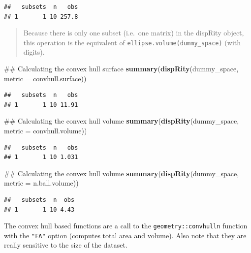 \documentclass[]{book}
\newenvironment{Shaded}{\begin{snugshade}}{\end{snugshade}}
\newcommand{\KeywordTok}[1]{\textcolor[rgb]{0.13,0.29,0.53}{\textbf{#1}}}
\newcommand{\DataTypeTok}[1]{\textcolor[rgb]{0.13,0.29,0.53}{#1}}
\newcommand{\NormalTok}[1]{#1}
\theoremstyle{definition}
\theoremstyle{definition}
\theoremstyle{remark}
\begin{document}
\begin{verbatim}
##   subsets  n   obs
## 1       1 10 257.8
\end{verbatim}

\begin{quote}
Because there is only one subset (i.e.~one matrix) in the dispRity
object, this operation is the equivalent of
\texttt{ellipse.volume(dummy\_space)} (with digits).
\end{quote}

\begin{Shaded}
\begin{Highlighting}[]
\NormalTok{## Calculating the convex hull surface}
\KeywordTok{summary}\NormalTok{(}\KeywordTok{dispRity}\NormalTok{(dummy_space, }\DataTypeTok{metric =}\NormalTok{ convhull.surface))}
\end{Highlighting}
\end{Shaded}

\begin{verbatim}
##   subsets  n   obs
## 1       1 10 11.91
\end{verbatim}

\begin{Shaded}
\begin{Highlighting}[]
\NormalTok{## Calculating the convex hull volume}
\KeywordTok{summary}\NormalTok{(}\KeywordTok{dispRity}\NormalTok{(dummy_space, }\DataTypeTok{metric =}\NormalTok{ convhull.volume))}
\end{Highlighting}
\end{Shaded}

\begin{verbatim}
##   subsets  n   obs
## 1       1 10 1.031
\end{verbatim}

\begin{Shaded}
\begin{Highlighting}[]
\NormalTok{## Calculating the convex hull volume}
\KeywordTok{summary}\NormalTok{(}\KeywordTok{dispRity}\NormalTok{(dummy_space, }\DataTypeTok{metric =}\NormalTok{ n.ball.volume))}
\end{Highlighting}
\end{Shaded}

\begin{verbatim}
##   subsets  n  obs
## 1       1 10 4.43
\end{verbatim}

The convex hull based functions are a call to the
\texttt{geometry::convhulln} function with the \texttt{"FA"} option
(computes total area and volume). Also note that they are really
sensitive to the size of the dataset.
\end{document}
